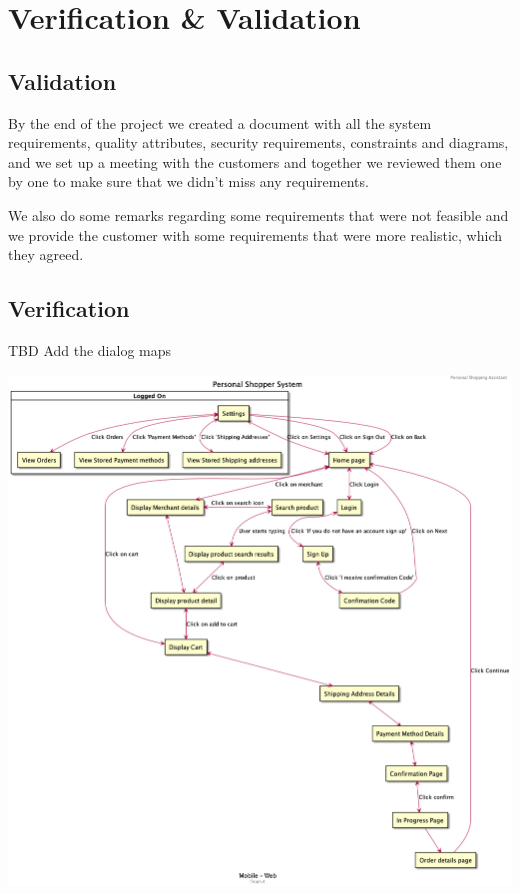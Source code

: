 \section{Verification \& Validation}
\subsection{Validation}
\noindent By the end of the project we created a document with all the system 
requirements, quality attributes, security requirements, constraints and 
diagrams, and we set up a meeting with the customers and together we reviewed 
them one by one to make sure that we didn’t miss any requirements. \newline

\noindent We also do some remarks regarding some requirements that were not 
feasible and we provide the customer with some requirements that were more 
realistic, which they agreed.

\pagebreak

\subsection{Verification}

TBD Add the dialog maps
\begin{center}
    \includegraphics[scale=0.30]{../images/pss.png}
\end{center}

